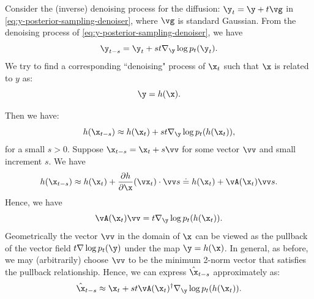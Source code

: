 \documentclass[../../book-main_zh.tex]{subfiles}
\begin{document}
Consider the (inverse) denoising process for the diffusion: $\y_t =
\y + t\vg $ in \eqref{eq:y-posterior-sampling-denoiser}, where $\vg$
is standard Gaussian. From the denoising process of
\eqref{eq:y-posterior-sampling-denoiser}, we have
\begin{equation}
    \y_{t-s} =  \y_t + st \nabla_{\y} \log p_t(\y_t).
\end{equation}
We try to find a corresponding ``denoising" process of $\x_t$ such
that $\x$ is related to $y$ as:
\begin{equation}
    \y =  h(\x).
\end{equation}

Then we have:
\begin{equation}
    h(\x_{t-s}) \approx  h(\x_t) + st \nabla_{\y} \log p_t(h(\x_t)),
\end{equation}
for a small $s >0$.
Suppose $\x_{t-s} = \x_t + s \vv$ for some vector $\vv$ and small
increment $s$. We have
\begin{equation}
    h(\x_{t-s}) \approx h(\x_t) + \frac{\partial h}{\partial
    \x}(\vx_{t}) \cdot \vv s \doteq h(\x_t) + \vA(\x_t) \vv s.
\end{equation}
Hence, we have
\begin{equation}
    \vA(\x_t) \vv = t \nabla_{\y} \log p_t(h(\x_t)).
    \label{eqn:pushforward}
\end{equation}
Geometrically the vector $\vv$ in the domain of $\x$ can be viewed as
the pullback of the vector field $t \nabla \log p_t(\y)$ under the
map $\y = h(\x)$. In general, as before, we may (arbitrarily) choose
$\vv$ to be the minimum 2-norm vector that satisfies the pullback
relationship. Hence, we can express  $\hat{\x}_{t-s}$ approximately as:
\begin{equation}
    \hat{\x}_{t-s} \approx \x_t + st\vA(\x_t)^\dagger \nabla_{\y}
    \log p_t(h(\x_t)).
    \label{eqn:pullback-denoise}
\end{equation}
\end{document}
